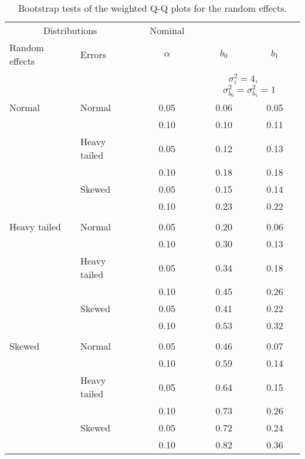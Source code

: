 

\begin{table}[ht]
\caption{\label{tab:langeryan}Bootstrap tests of the weighted Q-Q plots for the random effects.}
\begin{center}
\begin{scriptsize}
\begin{tabular}{ll p{.1cm} c p{.1cm} cc}
  \hline
  \multicolumn{2}{c}{Distributions} & & Nominal & & & \\ \cline{1-2}
  Random effects & Errors && $\alpha$ && $b_0$ & $b_1$ \\ 
  \hline
  & && && \multicolumn{2}{c}{$\sigma_{\varepsilon}^2 = 4$, \ \ $\sigma_{b_0}^2 = \sigma_{b_1}^2 = 1$} \\ \cline{6-7}
\rowcolor{gray!20}Normal       & Normal       && 0.05 &&  0.06 & 0.05 \\ 
\rowcolor{gray!20}             &              && 0.10 &&  0.10 & 0.11 \\ 
\rowcolor{gray!20}             & Heavy tailed && 0.05 &&  0.12 & 0.13 \\ 
\rowcolor{gray!20}             &              && 0.10 &&  0.18 & 0.18 \\ 
\rowcolor{gray!20}             & Skewed       && 0.05 &&  0.15 & 0.14 \\ 
\rowcolor{gray!20}             &              && 0.10 &&  0.23 & 0.22 \\ 
             &&&&&&\\
Heavy tailed & Normal       && 0.05 &&  0.20 & 0.06 \\ 
             &              && 0.10 &&  0.30 & 0.13 \\ 
             & Heavy tailed && 0.05 &&  0.34 & 0.18 \\ 
             &              && 0.10 &&  0.45 & 0.26 \\ 
             & Skewed       && 0.05 &&  0.41 & 0.22 \\ 
             &              && 0.10 &&  0.53 & 0.32 \\ 
             &&&&&&\\
Skewed       & Normal       && 0.05 &&  0.46 & 0.07 \\ 
             &              && 0.10 &&  0.59 & 0.14 \\ 
             & Heavy tailed && 0.05 &&  0.64 & 0.15 \\ 
             &              && 0.10 &&  0.73 & 0.26 \\ 
             & Skewed       && 0.05 &&  0.72 & 0.24 \\ 
             &              && 0.10 &&  0.82 & 0.36 \\


\end{tabular}
\end{scriptsize}
\end{center}
\end{table}
